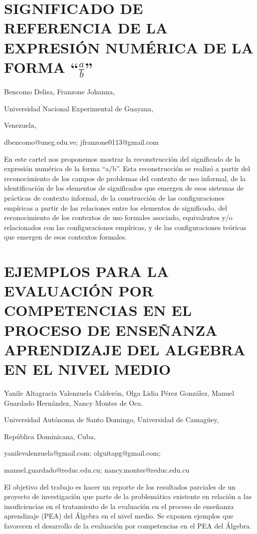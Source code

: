 \section{SIGNIFICADO DE REFERENCIA DE LA EXPRESIÓN NUMÉRICA DE LA FORMA “$\frac{a}{b}$” }

\begin{datos}

Bencomo Delisa, Franzone Johanna,

Universidad Nacional Experimental de Guayana,

Venezuela,

dbencomo@uneg.edu.ve; jfranzone0113@gmail.com 

\end{datos}

En este cartel nos proponemos mostrar la reconstrucción del significado
de la expresión numérica de la forma “a/b”. Esta reconstrucción se
realizó a partir del reconocimiento de los campos de problemas del
contexto de uso informal, de la identificación de los elementos de
significados que emergen de esos sistemas de prácticas de contexto
informal, de la construcción de las configuraciones empíricas a partir
de las relaciones entre los elementos de significado, del reconocimiento
de los contextos de uso formales asociado, equivalentes y/o relacionados
con las configuraciones empíricas, y de las configuraciones teóricas
que emergen de esos contextos formales. 


\section{EJEMPLOS PARA LA EVALUACIÓN POR COMPETENCIAS EN EL PROCESO DE ENSEÑANZA
APRENDIZAJE DEL ALGEBRA EN EL NIVEL MEDIO}

\begin{datos}

Yanile Altagracia Valenzuela Calderón, Olga Lidia Pérez González,
Manuel Guardado Hernández, Nancy Montes de Oca.

Universidad Autónoma de Santo Domingo, Universidad de Camagüey,

República Dominicana, Cuba,

yanilevalenzuela@gmail.com; olguitapg@gmail.com; 

manuel.guardado@reduc.edu.cu; nancy.montes@reduc.edu.cu

\end{datos}

El objetivo del trabajo es hacer un reporte de los resultados parciales
de un proyecto de investigación que parte de la problemática existente
en relación a las insuficiencias en el tratamiento de la evaluación
en el proceso de enseñanza aprendizaje (PEA) del Álgebra en el nivel
medio. Se exponen ejemplos que favorecen el desarrollo de la evaluación
por competencias en el PEA del Álgebra. 


